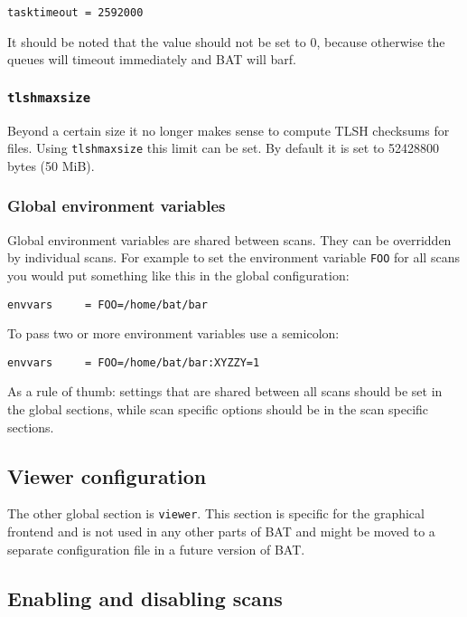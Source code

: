 \documentclass[10pt,a4paper]{article}
\begin{document}
\begin{verbatim}
tasktimeout = 2592000
\end{verbatim}

It should be noted that the value should not be set to 0, because otherwise
the queues will timeout immediately and BAT will barf.

\subsubsection{\texttt{tlshmaxsize}}

Beyond a certain size it no longer makes sense to compute TLSH checksums for
files. Using \texttt{tlshmaxsize} this limit can be set. By default it is set
to 52428800 bytes (50 MiB).

\subsubsection{Global environment variables}

Global environment variables are shared between scans. They can be overridden
by individual scans. For example to set the environment variable \texttt{FOO}
for all scans you would put something like this in the global configuration:

\begin{verbatim}
envvars     = FOO=/home/bat/bar
\end{verbatim}

To pass two or more environment variables use a semicolon:

\begin{verbatim}
envvars     = FOO=/home/bat/bar:XYZZY=1
\end{verbatim}

As a rule of thumb: settings that are shared between all scans should be set in
the global sections, while scan specific options should be in the scan
specific sections.

\subsection{Viewer configuration}

The other global section is \texttt{viewer}. This section is specific for the
graphical frontend and is not used in any other parts of BAT and might be moved
to a separate configuration file in a future version of BAT.

\subsection{Enabling and disabling scans}
\end{document}
